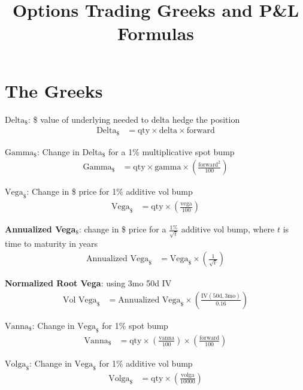 \documentclass{article}
\title{Options Trading Greeks and P\&L Formulas}
\date{}
\begin{document}
\maketitle

\section*{The Greeks}

\noindent \textbf{$\text{Delta}_{\$}$}: \$ value of underlying needed to delta hedge the position
\begin{align*}
\text{Delta}_{\$} &= \text{qty} \times \text{delta} \times \text{forward}
\end{align*}

\noindent \textbf{$\text{Gamma}_{\$}$}: Change in Delta$_{\$}$ for a 1\% multiplicative spot bump
\begin{align*}
\text{Gamma}_{\$} &= \text{qty} \times \text{gamma} \times \left( \frac{\text{forward}^2}{100} \right)
\end{align*}

\noindent \textbf{$\text{Vega}_{\$}$}: Change in \$ price for 1\% additive vol bump
\begin{align*}
\text{Vega}_{\$} &= \text{qty} \times \left( \frac{\text{vega}}{100} \right)
\end{align*}

\noindent \textbf{Annualized Vega$_{\$}$}: change in \$ price for a $\frac{1\%}{\sqrt{t}}$ additive vol bump, where $t$ is time to maturity in years
\begin{align*}
\text{Annualized Vega}_{\$} &= \text{Vega}_{\$} \times \left( \frac{1}{\sqrt{t}} \right)
\end{align*}

\noindent \textbf{Normalized Root Vega}: using 3mo 50d IV
\begin{align*}
\text{Vol Vega}_{\$} &= \text{Annualized Vega}_{\$} \times \left( \frac{\text{IV}(50\text{d}, 3\text{mo})}{0.16} \right)
\end{align*}

\noindent \textbf{$\text{Vanna}_{\$}$}: Change in $\text{Vega}_{\$}$ for 1\% spot bump
\begin{align*}
\text{Vanna}_{\$} &= \text{qty} \times \left( \frac{\text{vanna}}{100} \right) \times \left( \frac{\text{forward}}{100} \right)
\end{align*}

\noindent \textbf{$\text{Volga}_{\$}$}: Change in $\text{Vega}_{\$}$ for 1\% additive vol bump
\begin{align*}
\text{Volga}_{\$} &= \text{qty} \times \left( \frac{\text{volga}}{10000} \right)
\end{align*}
\end{document}
